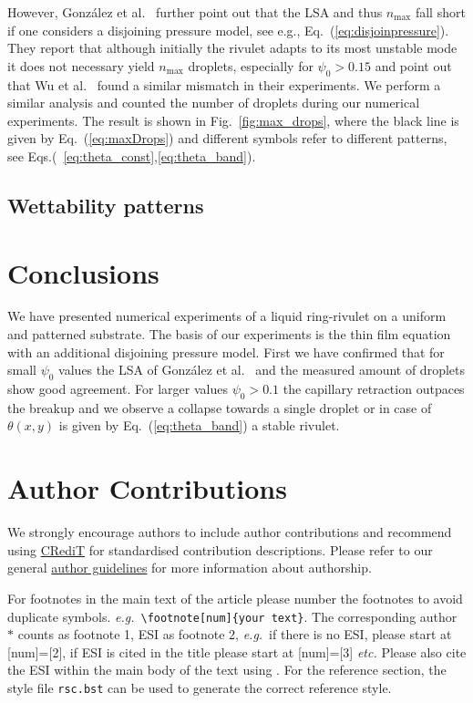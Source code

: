 \documentclass[twoside,twocolumn,9pt]{article}
\begin{document}
However, Gonz{\'a}lez et al.~\cite{gonzalezStabilityLiquidRing2013} further point out that the LSA and thus $n_{\max}$ fall short if one considers a disjoining pressure model, see e.g., Eq.~(\ref{eq:disjoinpressure}).
They report that although initially the rivulet adapts to its most unstable mode it does not necessary yield $n_{\max}$ droplets, especially for $\psi_0 > 0.15$ and point out that Wu et al.~\cite{wuCompetingLiquidPhase2011} found a similar mismatch in their experiments.
We perform a similar analysis and counted the number of droplets during our numerical experiments.
The result is shown in Fig.~\ref{fig:max_drops}, where the black line is given by Eq.~(\ref{eq:maxDrops}) and different symbols refer to different patterns, see Eqs.(~\ref{eq:theta_const},\ref{eq:theta_band}).

\subsection{Wettability patterns}\label{subsec:wettability}


\section{Conclusions}\label{sec:conclu}
We have presented numerical experiments of a liquid ring-rivulet on a uniform and patterned substrate. 
The basis of our experiments is the thin film equation with an additional disjoining pressure model.
First we have confirmed that for small $\psi_0$ values the LSA of Gonz{\'a}lez et al.~\cite{gonzalezStabilityLiquidRing2013} and the measured amount of droplets show good agreement.
For larger values $\psi_0 > 0.1$ the capillary retraction outpaces the breakup and we observe a collapse towards a single droplet or in case of $\theta(x,y)$ is given by Eq.~(\ref{eq:theta_band}) a stable rivulet.



\section*{Author Contributions}
We strongly encourage authors to include author contributions and recommend using \href{https://casrai.org/credit/}{CRediT} for standardised contribution descriptions. Please refer to our general \href{https://www.rsc.org/journals-books-databases/journal-authors-reviewers/author-responsibilities/}{author guidelines} for more information about authorship.

For footnotes in the main text of the article please number the footnotes to avoid duplicate symbols. \textit{e.g.}\ \texttt{\textbackslash footnote[num]\{your text\}}. The corresponding author $\ast$ counts as footnote 1, ESI as footnote 2, \textit{e.g.}\ if there is no ESI, please start at [num]=[2], if ESI is cited in the title please start at [num]=[3] \textit{etc.} Please also cite the ESI within the main body of the text using \dag. For the reference section, the style file \texttt{rsc.bst} can be used to generate the correct reference style.
\end{document}
